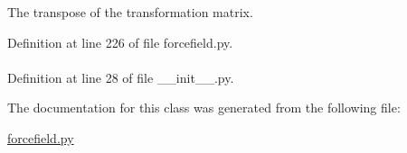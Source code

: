 \-The transpose of the transformation matrix. 



\-Definition at line 226 of file forcefield.\-py.

\hypertarget{classforcebalance_1_1BaseClass_afd68efa29ccd2f320f4cf82198214aac}{
\paragraph[{verbose\-\_\-options}]{}}\label{classforcebalance_1_1BaseClass_afd68efa29ccd2f320f4cf82198214aac}


\-Definition at line 28 of file \-\_\-\-\_\-init\-\_\-\-\_\-.\-py.



\-The documentation for this class was generated from the following file\-:\begin{DoxyCompactItemize}
\item 
\hyperlink{forcefield_8py}{forcefield.\-py}\end{DoxyCompactItemize}
